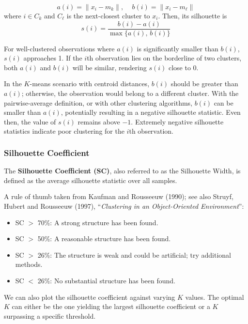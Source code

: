 \documentclass[
]{book}
\providecommand{\tightlist}{%
  \setlength{\itemsep}{0pt}\setlength{\parskip}{0pt}}
\begin{document}
\[a(i) = \|x_i - m_k\|,\,\,\,\,\,\,\, b(i) = \|x_i - m_{\ell}\|\]
where \(i\in C_k\) and \(C_{\ell}\) is the next-closest cluster to \(x_i\). Then, its silhouette is
\[s(i) = \frac{b(i) - a(i)}{\max \{a(i),\, b(i)\} }\]

For well-clustered observations where \(a(i)\) is significantly smaller than \(b(i)\), \(s(i)\) approaches 1. If the \(i\)th observation lies on the borderline of two clusters, both \(a(i)\) and \(b(i)\) will be similar, rendering \(s(i)\) close to 0.

In the \(K\)-means scenario with centroid distances, \(b(i)\) should be greater than \(a(i)\); otherwise, the observation would belong to a different cluster. With the pairwise-average definition, or with other clustering algorithms, \(b(i)\) can be smaller than \(a(i)\), potentially resulting in a negative silhouette statistic. Even then, the value of \(s(i)\) remains above \(-1\). Extremely negative silhouette statistics indicate poor clustering for the \(i\)th observation.

\subsubsection*{Silhouette Coefficient}\label{silhouette-coefficient}

The \textbf{Silhouette Coefficient (SC)}, also referred to as the Silhouette Width, is defined as the average silhouette statistic over all samples.

A rule of thumb taken from Kaufman and Rousseeuw (1990); see also Struyf, Hubert and Rousseeuw (1997), ``\emph{Clustering in an Object-Oriented Environment}'':

\begin{itemize}
\tightlist
\item
  SC \(>\) 70\%: A strong structure has been found.
\item
  SC \(>\) 50\%: A reasonable structure has been found.
\item
  SC \(>\) 26\%: The structure is weak and could be artificial; try additional methods.
\item
  SC \(<\) 26\%: No substantial structure has been found.
\end{itemize}

We can also plot the silhouette coefficient against varying \(K\) values. The optimal \(K\) can either be the one yielding the largest silhouette coefficient or a \(K\) surpassing a specific threshold.
\end{document}
